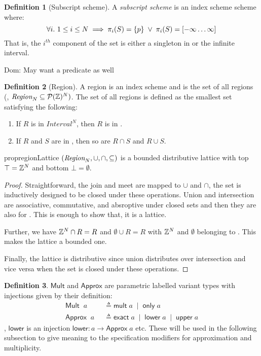 \documentclass[acmlarge,review,anonymous]{acmart}\settopmatter{printfolios=true}
\newcommand{\dnote}[1]{\textcolor{darkpurple}{Dom: #1}}
\theoremstyle{definition}
\newtheorem{defn}{Definition}
\theoremstyle{plain}
\theoremstyle{remark}
\begin{document}
\begin{defn}[Subscript scheme]
  A \emph{subscript scheme} is an index scheme scheme where:
  \begin{equation*}
    \forall i.\ 1 \leq i \leq N \implies
      \pi_i (S) = \{ p \}
      \; \vee \;
      \pi_i (S) = \textnormal{$\lbrack-\infty\ldots\infty\rbrack^{}$}
    \end{equation*}
%
  That is, the $i^{th}$ component of the set is either a singleton in \bz{} or
  the infinite interval.
\end{defn}
%
\dnote{May want a predicate as well}
   
\begin{defn}[Region]
  A region is an index scheme and  is the set of all regions (\ie{},
  $\textnormal{$\textit{Region}_{N}$} \subseteq \mathcal{P}(\textnormal{$\mathbb{Z}$})^N)$. The set of all regions is  defined
  as the smallest set satisfying the following:
%
  \begin{enumerate}
    \item If $R$ is in $\textit{Interval}^N$, then $R$ is in .
    \item If $R$ and $S$ are in , then so are $R \cap S$ and
      $R \cup S$.
  \end{enumerate}
\end{defn}
%
\begin{restatable}{prop}{regionLattice}
  \label{prop:regionLattice}
  $(\textnormal{$\textit{Region}_{N}$},\cup,\cap,\subseteq)$ is a bounded distributive lattice with top
  $\top = \textnormal{$\mathbb{Z}$}{}^N$ and bottom $\bot = \emptyset$.
\end{restatable}
%
\begin{proof}
  Straightforward, the join and meet are mapped to $\cup$ and $\cap$, the set is
  inductively designed to be closed under these operations. Union and
  intersection are associative, commutative, and absroptive under closed sets
  and then they are also for . This is enough to show that, it is a
  lattice.

  Further, we have $\textnormal{$\mathbb{Z}$}{}^N \cap R = R$ and $\emptyset \cup R = R$ with
  $\textnormal{$\mathbb{Z}$}{}^N$ and $\emptyset$ belonging to . This makes the lattice a
  bounded one.

  Finally, the lattice is distributive since union distributes over intersection
  and vice versa when the set is closed under these operations.
\end{proof}

\begin{defn}
  $\mathsf{Mult}$ and $\mathsf{Approx}$ are parametric labelled variant types
  with injections given by their definition:
%
  \begin{align*}
    \mathsf{Mult} \;\; a \;\; &
      \triangleq \mathsf{mult} \; a \;\mid\; \mathsf{only} \; a \\
    \mathsf{Approx} \;\; a \;\; &
      \triangleq \mathsf{exact} \; a \;\mid\; \mathsf{lower} \; a \;\mid\;
        \mathsf{upper} \; a
  \end{align*}
%
  \eg{}, $\mathsf{lower}$ is an injection $\mathsf{lower} : a \to \mathsf{Approx}
  \; a$ etc.
  These will be used in the following subsection to give meaning to the
  specification modifiers for approximation and multiplicity.
\end{defn}
\end{document}
